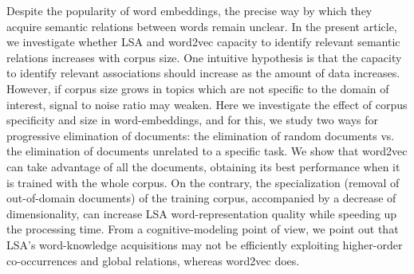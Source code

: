 Despite the popularity of word embeddings, the precise way by which they acquire semantic relations between words remain unclear. In the present article, we investigate whether LSA and word2vec capacity to identify relevant semantic relations increases with corpus size. One intuitive hypothesis is that the capacity to identify relevant associations should increase as the amount of data increases. However, if corpus size grows in topics which are not specific to the domain of interest, signal to noise ratio may weaken. Here we investigate the effect of corpus specificity and size in word-embeddings, and for this, we study two ways for progressive elimination of documents: the elimination of random documents vs. the elimination of documents unrelated to a specific task. We show that word2vec can take advantage of all the documents, obtaining its best performance when it is trained with the whole corpus. On the contrary, the specialization (removal of out-of-domain documents) of the training corpus, accompanied by a decrease of dimensionality, can increase LSA word-representation quality while speeding up the processing time. From a cognitive-modeling point of view, we point out that LSA's word-knowledge acquisitions may not be efficiently exploiting higher-order co-occurrences and global relations, whereas word2vec does.
